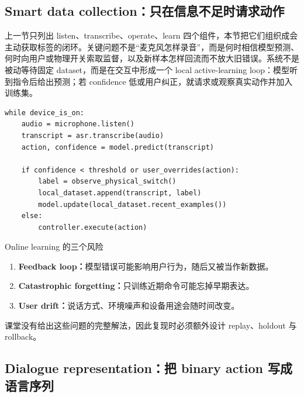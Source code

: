 \subsection{Smart data collection：只在信息不足时请求动作}

上一节只列出 listen、transcribe、operate、learn 四个组件，本节把它们组织成会主动获取标签的闭环。关键问题不是“麦克风怎样录音”，而是何时相信模型预测、何时向用户或物理开关索取监督，以及新样本怎样回流而不放大旧错误。系统不是被动等待固定 dataset，而是在交互中形成一个 local active-learning loop：模型听到指令后给出预测；若 confidence 低或用户纠正，就请求或观察真实动作并加入训练集。


\begin{lstlisting}[caption={本地语音开关的交互学习状态机}]
while device_is_on:
    audio = microphone.listen()
    transcript = asr.transcribe(audio)
    action, confidence = model.predict(transcript)

    if confidence < threshold or user_overrides(action):
        label = observe_physical_switch()
        local_dataset.append(transcript, label)
        model.update(local_dataset.recent_examples())
    else:
        controller.execute(action)
\end{lstlisting}

\begin{knowledgebox}{Online learning 的三个风险}
\begin{enumerate}
  \item \textbf{Feedback loop：}模型错误可能影响用户行为，随后又被当作新数据。
  \item \textbf{Catastrophic forgetting：}只训练近期命令可能忘掉早期表达。
  \item \textbf{User drift：}说话方式、环境噪声和设备用途会随时间改变。
\end{enumerate}
课堂没有给出这些问题的完整解法，因此复现时必须额外设计 replay、holdout 与 rollback。
\end{knowledgebox}


\subsection{Dialogue representation：把 binary action 写成语言序列}

